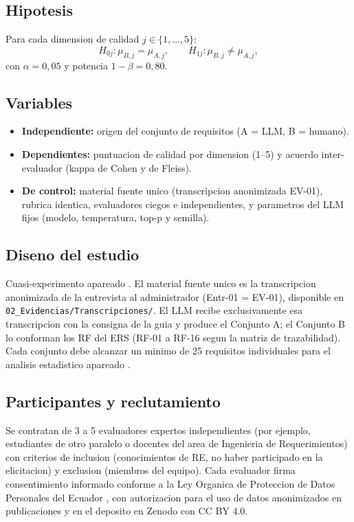 \documentclass[11pt,a4paper]{article}
\begin{document}
\subsection{Hipotesis}
Para cada dimension de calidad \(j \in \{1, \ldots, 5\}\):
\[
H_{0j}: \mu_{B,j} = \mu_{A,j}, \qquad
H_{1j}: \mu_{B,j} \neq \mu_{A,j},
\]
con \(\alpha = 0{,}05\) y potencia \(1-\beta = 0{,}80\).

\subsection{Variables}
\begin{itemize}
    \item \textbf{Independiente:} origen del conjunto de requisitos (A = LLM,
    B = humano).
    \item \textbf{Dependientes:} puntuacion de calidad por dimension (1--5) y
    acuerdo inter-evaluador (kappa de Cohen y de Fleiss).
    \item \textbf{De control:} material fuente unico (transcripcion
    anonimizada EV-01), rubrica identica, evaluadores ciegos e independientes,
    y parametros del LLM fijos (modelo, temperatura, top-p y semilla).
\end{itemize}

\subsection{Diseno del estudio}
Cuasi-experimento apareado \cite{wohlin2012}. El material fuente unico es la
transcripcion anonimizada de la entrevista al administrador (Entr-01 = EV-01),
disponible en \texttt{02\_Evidencias/Transcripciones/}. El LLM recibe
exclusivamente esa transcripcion con la consigna de la guia y produce el
Conjunto A; el Conjunto B lo conforman los RF del ERS (RF-01 a RF-16 segun la
matriz de trazabilidad). Cada conjunto debe alcanzar un minimo de 25 requisitos
individuales para el analisis estadistico apareado \cite{montgomery2022}.

\subsection{Participantes y reclutamiento}
Se contratan de 3 a 5 evaluadores expertos independientes (por ejemplo,
estudiantes de otro paralelo o docentes del area de Ingenieria de
Requerimientos) con criterios de inclusion (conocimientos de RE, no haber
participado en la elicitacion) y exclusion (miembros del equipo). Cada
evaluador firma consentimiento informado conforme a la Ley Organica de
Proteccion de Datos Personales del Ecuador \cite{lopdp2021}, con autorizacion
para el uso de datos anonimizados en publicaciones y en el deposito en Zenodo
con CC BY 4.0.
\end{document}
